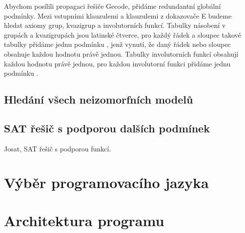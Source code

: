 Abychom posílili propagaci řešiče Gecode, přidáme redundantní
globální pod\-mín\-ky.
Mezi vstupními klauzulemi a klauzulemi z dokazovače E
budeme hledat axiomy grup, kvazigrup a involutorních funkcí.
Tabulky násobení v grupách a kvazigrupách jsou latinské čtverce,
pro každý řádek a sloupec takové tabulky přidáme jednu podmínku
, jenž vynutí, že daný řádek nebo
sloupec obsahuje každou hodnotu právě jednou.
Tabulky involutorních funkcí obsahují každou hodnotu právě jednou,
pro každou involutorní funkci přidáme jednu podmínku
.

\subsection{Hledání všech neizomorfních modelů}

\subsection{SAT řešič s podporou dalších podmínek}

Josat, SAT řešič s podporou funkcí.

\section{Výběr programovacího jazyka}

\section{Architektura programu}
